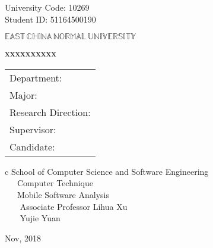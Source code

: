 \newpage

\pagestyle{empty}

\hskip 1.83cm {\large University Code: 10269}\\
\hspace*{\fill} {\large Student ID: 51164500190 }

\vskip 2cm

\begin{center}
{\Huge $\mathbb{EAST}\,\mathbb{CHINA}\,\mathbb{NORMAL}\,
\mathbb{UNIVERSITY}$}
\end{center}

\vskip 3cm

\begin{center}
\bfseries{\scshape{\huge xxxxxxxxxx}}\\
\end{center}

\vskip 2cm {\large
\begin{center}
\begin{tabular}{l}
Department:\\
Major:\\ 
Research Direction:\\
Supervisor:\\
Candidate:
\end{tabular}
\begin{tabular}c
\normalsize{School of Computer Science and Software Engineering}\\
\hline ~~~Computer Technique    \\
\hline ~~~Mobile Software Analysis\\
\hline ~~~ Associate Professor Lihua Xu\\
\hline ~~~  Yujie  Yuan\\
\hline
\end{tabular}
\end{center}}

\vskip 30mm

\begin{center}
{\Large Nov, 2018}
\end{center}
